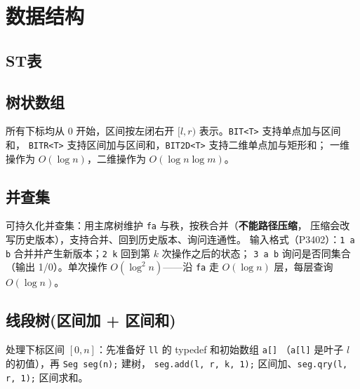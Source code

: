 \documentclass[11pt,a4paper,twocolumn]{ctexart}  %
\begin{document}
\clearpage

\section{数据结构}

\subsection{ST表}


\subsection{树状数组}
所有下标均从 $0$ 开始，区间按左闭右开 $[l,r)$ 表示。\texttt{BIT<T>} 支持单点加与区间和，
\texttt{BITR<T>} 支持区间加与区间和，\texttt{BIT2D<T>} 支持二维单点加与矩形和；
一维操作为 $O(\log n)$，二维操作为 $O(\log n\log m)$。


\subsection{并查集}


\newpage




可持久化并查集：用主席树维护 \texttt{fa} 与秩，按秩合并（\textbf{不能路径压缩}，
压缩会改写历史版本），支持合并、回到历史版本、询问连通性。
输入格式（P3402）：\texttt{1 a b} 合并并产生新版本；\texttt{2 k} 回到第 $k$ 次操作之后的状态；
\texttt{3 a b} 询问是否同集合（输出 1/0）。单次操作 $O(\log^2 n)$——沿 \texttt{fa}
走 $O(\log n)$ 层，每层查询 $O(\log n)$。



\subsection{线段树(区间加 + 区间和)}
处理下标区间 $[0,n]$：先准备好 \texttt{ll} 的 typedef 和初始数组 \texttt{a[]}
（\texttt{a[l]} 是叶子 $l$ 的初值），再 \texttt{Seg seg(n);} 建树，
\texttt{seg.add(l, r, k, 1);} 区间加、\texttt{seg.qry(l, r, 1);} 区间求和。

\end{document}
